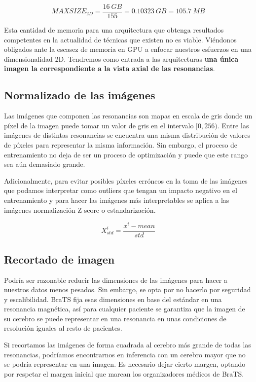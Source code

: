 $$ MAXSIZE_{2D} = \frac{16\ GB}{155}  = 0.10323\ GB = 105.7\ MB $$  

Esta cantidad de memoria para una arquitectura que obtenga resultados competentes en la actualidad de técnicas que existen no es viable. Viéndonos obligados ante la escasez de memoria en GPU a enfocar nuestros esfuerzos en una dimensionalidad 2D. Tendremos como entrada a las arquitecturas \textbf{una única imagen la correspondiente a la vista axial de las resonancias}.

\subsection{Normalizado de las imágenes}

Las imágenes que componen las resonancias son mapas en escala de gris donde un píxel de la imagen puede tomar un valor de gris en el intervalo $[0, 256)$. Entre las imágenes de distintas resonancias se encuentra una misma distribución de valores de píxeles para representar la misma información. Sin embargo, el proceso de entrenamiento no deja de ser un proceso de optimización y puede que este rango sea aún demasiado grande.

Adicionalmente, para evitar posibles píxeles erróneos en la toma de las imágenes que podamos interpretar como outliers que tengan un impacto negativo en el entrenamiento y para hacer las imágenes más interpretables se aplica a las imágenes normalización Z-score o estandarización.

$$ X_{std}^{i}= \frac{x^{i}-mean}{std} $$



\subsection{Recortado de imagen}

Podría ser razonable reducir las dimensiones de las imágenes para hacer a nuestros datos menos pesados. Sin embargo, se opta por no hacerlo por seguridad y escalibilidad. BraTS fija esas dimensiones en base del estándar en una resonancia magnética, así para cualquier paciente se garantiza que la imagen de su cerebro se puede representar en una resonancia en unas condiciones de resolución iguales al resto de pacientes.

Si recortamos las imágenes de forma cuadrada al cerebro más grande de todas las resonancias, podríamos encontrarnos en inferencia con un cerebro mayor que no se podría representar en una imagen. Es necesario dejar cierto margen, optando por respetar el margen inicial que marcan los organizadores médicos de BraTS.

